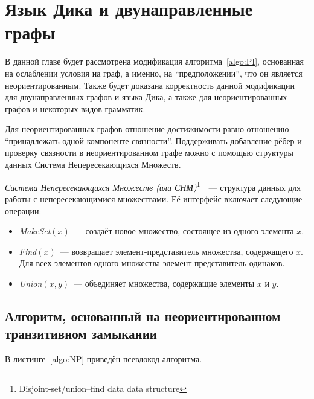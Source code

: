 \section{Язык Дика и двунаправленные графы}\label{section:bidirected}

В данной главе будет рассмотрена модификация алгоритма~\ref{algo:PI}, основанная на ослаблении условия на граф, а именно, на ``предположении'', что он является неориентированным. Также будет доказана корректность данной модификации для двунаправленных графов и языка Дика, а также для неориентированных графов и некоторых видов грамматик.

Для неориентированных графов отношение достижимости равно отношению ``принадлежать одной компоненте связности''. Поддерживать добавление рёбер и проверку связности в неориентированном графе можно с помощью структуры данных Система Непересекающихся Множеств. 

\begin{definition}\label{def:DSU}
  \textit{Система Непересекающихся Множеств (или СНМ)}\footnote{Disjoint-set/union–find data data structure}~\cite{Galler1964}~--- структура данных для работы с непересекающимися множествами. Её интерфейс включает следующие операции:
  \vspace{-\topsep}
  \begin{itemize}
    \setlength\itemsep{-0.1em}
    \item \textit{MakeSet}$(x)$~--- создаёт новое множество, состоящее из одного элемента $x$.
    \item \textit{Find}$(x)$~--- возвращает элемент-представитель множества, содержащего $x$.\\ Для всех элементов одного множества элемент-представитель одинаков.
    \item \textit{Union}$(x, y)$~--- объединяет множества, содержащие элементы $x$ и $y$.
  \end{itemize}
\end{definition}

\subsection{Алгоритм, основанный на неориентированном\\ транзитивном замыкании}\label{subsection:undirected}

В листинге~\ref{algo:NP} приведён псевдокод алгоритма.

